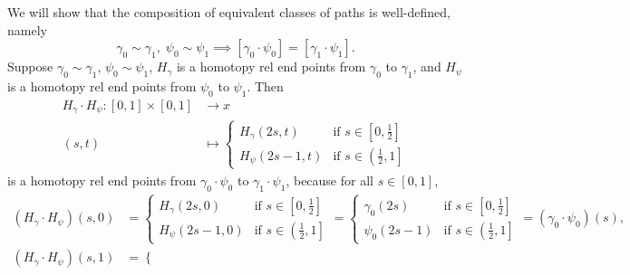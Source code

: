 \documentclass{report}
\begin{document}
\begin{prf}
	We will show that the composition of equivalent classes of paths is                                                                  well-defined, namely
	\[
		\gamma_0\sim \gamma_1,\;\psi_0\sim \psi_1\implies [\gamma_0\cdot \psi_0] = [\gamma_1\cdot\psi_1].
	\]
	Suppose $\gamma_0\sim \gamma_1$, $\psi_0\sim \psi_1$, $H_{\gamma}$ is a homotopy rel end points from $\gamma_0$ to $\gamma_1$, and $H_{\psi}$ is a homotopy rel end points from $\psi_0$ to $\psi_1$. Then
	\begin{align*}
		H_{\gamma}\cdot H_{\psi}:[0,1]\times [0,1] & \longrightarrow x                                                                                 \\
		(s,t)                                      & \longmapsto \begin{cases}
			                                                         H_{\gamma}(2s, t) & \text{if }s\in\left[0,\frac{1}{2}\right]              \\
			                                                         H_{\psi}(2s-1, t) & \text{if }s\in\left(\left.\frac{1}{2},1\right]\right.
		                                                         \end{cases}
	\end{align*}
	is a homotopy rel end points from $\gamma_0\cdot\psi_0$ to $\gamma_1\cdot\psi_1$, because for all $s\in[0,1]$,
	\[\begin{aligned}
			\left(H_{\gamma}\cdot H_{\psi}\right)(s, 0) & =\begin{cases}
				                                               H_{\gamma}(2s, 0) & \text{if }s\in\left[0,\frac{1}{2}\right]              \\
				                                               H_{\psi}(2s-1, 0) & \text{if }s\in\left(\left.\frac{1}{2},1\right]\right.
			                                               \end{cases}=\begin{cases}
				                                                           \gamma_0(2s) & \text{if }s\in\left[0,\frac{1}{2}\right]              \\
				                                                           \psi_0(2s-1) & \text{if }s\in\left(\left.\frac{1}{2},1\right]\right.
			                                                           \end{cases}=\left(\gamma_0\cdot \psi_0\right)(s), \\
			\left(H_{\gamma}\cdot H_{\psi}\right)(s, 1) & =\begin{cases}

\end{cases}
\end{aligned}\]
\end{prf}
\end{document}
